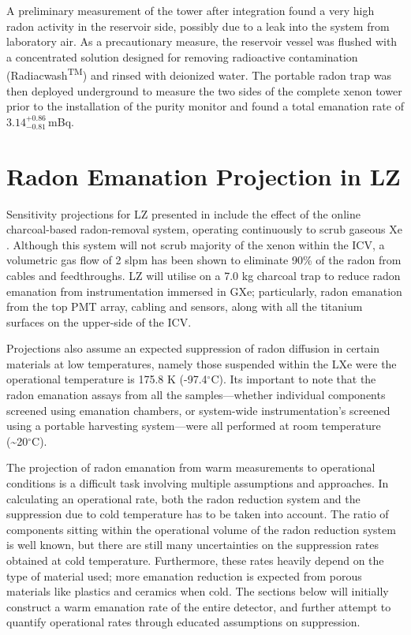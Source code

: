 A preliminary measurement of the tower after integration found a very high radon activity in the reservoir side, possibly due to a leak into the system from laboratory air. As a precautionary measure, the reservoir vessel was flushed with a concentrated solution designed for removing radioactive contamination (Radiacwash\textsuperscript{TM}) and rinsed with deionized water. The portable radon trap was then deployed underground to measure the two sides of the complete xenon tower prior to the installation of the purity monitor and found a total emanation rate of $3.14^{+0.86}_{-0.81}$\,mBq.


\section{Radon Emanation Projection in LZ}
\label{sec:lzradon}

Sensitivity projections for LZ presented in \cite{akerib2018projected} include the effect of the online charcoal-based radon-removal system, operating continuously to scrub gaseous Xe \cite{lz_tdr, Pushkin:2018wdl}. Although this system will not scrub majority of the xenon within the ICV, a volumetric gas flow of 2 slpm has been shown to eliminate 90\% of the radon from cables and feedthroughs. LZ will utilise on a 7.0 kg charcoal trap to reduce radon emanation from instrumentation immersed in GXe; particularly, radon emanation from the top PMT array, cabling and sensors, along with all the titanium surfaces on the upper-side of the ICV. 

Projections also assume an expected suppression of radon diffusion in certain materials at low temperatures, namely those suspended within the LXe were the operational temperature is 175.8 K (-97.4$^{\circ{}}$C). Its important to note that the radon emanation assays from all the samples---whether individual components screened using emanation chambers, or system-wide instrumentation's screened using a portable harvesting system---were all performed at room temperature (\sim{}20$^{\circ{}}$C).

The projection of radon emanation from warm measurements to operational conditions is a difficult task involving multiple assumptions and approaches. In calculating an operational rate, both the radon reduction system and the suppression due to cold temperature has to be taken into account. The ratio of components sitting within the operational volume of the radon reduction system is well known, but there are still many uncertainties on the suppression rates obtained at cold temperature. Furthermore, these rates heavily depend on the type of material used; more emanation reduction is expected from porous materials like plastics and ceramics when cold. The sections below will initially construct a warm emanation rate of the entire detector, and further attempt to quantify operational rates through educated assumptions on suppression.  


